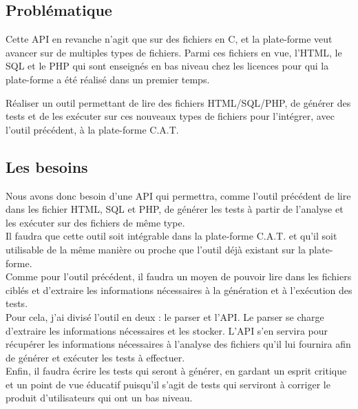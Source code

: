 \subsection{Problématique}

Cette API en revanche n'agit que sur des fichiers en C, et la plate-forme veut avancer sur de multiples types de fichiers. Parmi ces fichiers en vue, l'HTML, le SQL et le PHP qui sont enseignés en bas niveau chez les licences pour qui la plate-forme a été réalisé dans un premier temps.\\

\begin{center}
Réaliser un outil permettant de lire des fichiers HTML/SQL/PHP, de générer des tests et de les exécuter sur ces nouveaux types de fichiers pour l'intégrer, avec l’outil précédent, à la plate-forme C.A.T.
\end{center}

\subsection{Les besoins}

Nous avons donc besoin d'une API qui permettra, comme l'outil précédent de lire dans les fichier HTML, SQL et PHP, de générer les tests à partir de l'analyse et les exécuter sur des fichiers de même type.\\

Il faudra que cette outil soit intégrable dans la plate-forme C.A.T. et qu'il soit utilisable de la même manière ou proche que l'outil déjà existant sur la plate-forme.\\

Comme pour l'outil précédent, il faudra un moyen de pouvoir lire dans les fichiers ciblés et d'extraire les informations nécessaires à la génération et à l’exécution des tests.\\

Pour cela, j'ai divisé l'outil en deux : le parser et l'API. Le parser se charge d'extraire les informations nécessaires et les stocker. L'API s'en servira pour récupérer les informations nécessaires à l'analyse des fichiers qu'il lui fournira afin de générer et exécuter les tests à effectuer.\\

Enfin, il faudra écrire les tests qui seront à générer, en gardant un esprit critique et un point de vue éducatif puisqu'il s'agit de tests qui serviront à corriger le produit d'utilisateurs qui ont un bas niveau.\\

